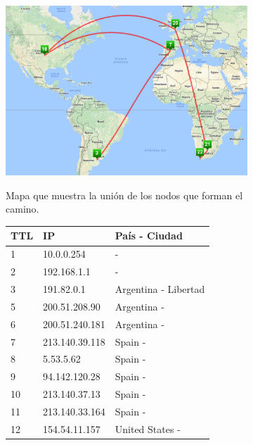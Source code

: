\begin{figure}[ht]
  \hspace*{-0.4cm}
  \begin{subfigure}[b]{.60\textwidth}
    \includegraphics[width=\textwidth]{Imagenes/capetown_map.png}
    \label{fig:capetown_map}
    \caption{Mapa que muestra la unión de los nodos que forman el camino.}
  \end{subfigure}
  \begin{subfigure}[b]{.39\textwidth}
    \footnotesize
    \begin{tabular}{ l l l }
      \hline
      \textbf{TTL} & \textbf{IP} &  \textbf{País - Ciudad} \\ \hline
      \rowcolor[RGB]{196,214,255}
      1 & 10.0.0.254 &  - \\ \hline
      2 & 192.168.1.1 &  - \\ \hline
      \rowcolor[RGB]{196,214,255}
      3 & 191.82.0.1 & Argentina - Libertad\\ \hline
      5 & 200.51.208.90 & Argentina - \\ \hline
      6 & 200.51.240.181 & Argentina - \\ \hline
      7 & 213.140.39.118 & Spain - \\ \hline
      \rowcolor[RGB]{196,214,255}
      8 & 5.53.5.62 & Spain - \\ \hline
      9 & 94.142.120.28 & Spain - \\ \hline
      10 & 213.140.37.13 & Spain - \\ \hline
      11 & 213.140.33.164 & Spain - \\ \hline
      \rowcolor[RGB]{196,214,255}
      12 & 154.54.11.157 & United States - \\ \hline

\end{tabular}
\end{subfigure}
\end{figure}

